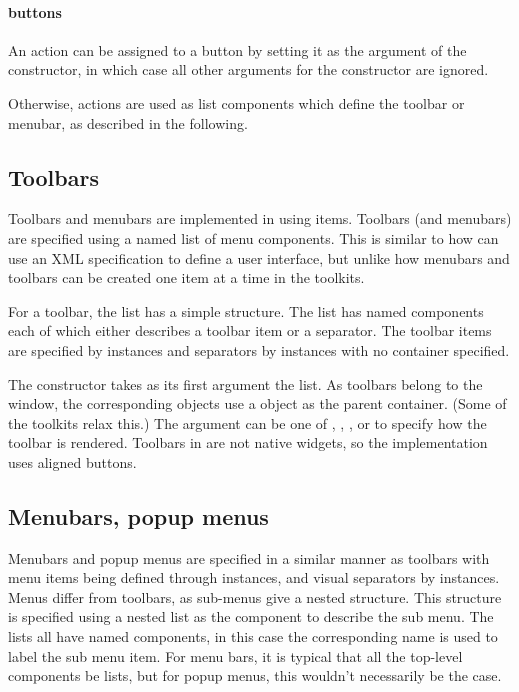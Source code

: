 \paragraph{buttons}
An action can be assigned to a button by setting it as the
 argument of the  constructor, in which
case all other arguments for the constructor are ignored. 

Otherwise, actions are used as list components which define the
toolbar or menubar, as described in the following.



\subsection{Toolbars}
\label{sec:gWidgets-toolbars}
Toolbars and menubars are implemented in  using
 items. Toolbars (and menubars) are specified using a named
list of menu components. This is similar to how  can use an XML specification
to define a user interface, but unlike how menubars and toolbars can
be created one item at a time in the toolkits.

For a toolbar, the list has a simple structure. The list has named
components each of which either describes a toolbar item or a
separator. The toolbar items are specified by  instances
and separators by  instances with no container
specified.


The  constructor takes as its first argument the
list.  As toolbars belong to the window, the corresponding
 objects use a  object as the
parent container. (Some of the toolkits relax this.)  The argument
 can be one of ,
, , or  to specify how
the toolbar is rendered. Toolbars in  are not
native widgets, so the implementation uses aligned buttons.




\subsection{Menubars, popup menus}
\label{sec:gWidgets-menubars}

Menubars and popup menus are specified in a similar manner as toolbars with menu items
being defined through  instances, and visual separators
by  instances. Menus differ from toolbars, as
sub-menus give a nested structure. This structure is specified using a
nested list as the component to describe the sub menu. The lists all
have named components, in this case the corresponding name is used to
label the sub menu item. For menu bars, it is typical that all the
top-level components be lists, but for popup menus, this wouldn't
necessarily be the case.

